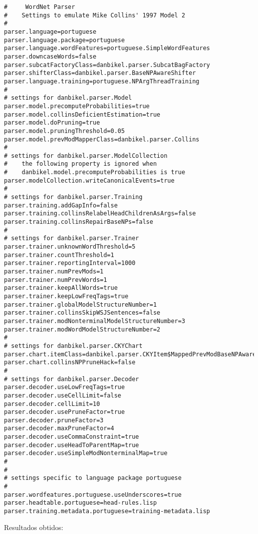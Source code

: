 \scriptsize
\begin{verbatim}
#     WordNet Parser
#    Settings to emulate Mike Collins' 1997 Model 2
#
parser.language=portuguese
parser.language.package=portuguese
parser.language.wordFeatures=portuguese.SimpleWordFeatures
parser.downcaseWords=false
parser.subcatFactoryClass=danbikel.parser.SubcatBagFactory
parser.shifterClass=danbikel.parser.BaseNPAwareShifter
parser.language.training=portuguese.NPArgThreadTraining
#
# settings for danbikel.parser.Model
parser.model.precomputeProbabilities=true
parser.model.collinsDeficientEstimation=true
parser.model.doPruning=true
parser.model.pruningThreshold=0.05
parser.model.prevModMapperClass=danbikel.parser.Collins
#
# settings for danbikel.parser.ModelCollection
#    the following property is ignored when
#    danbikel.model.precomputeProbabilities is true
parser.modelCollection.writeCanonicalEvents=true
#
# settings for danbikel.parser.Training
parser.training.addGapInfo=false
parser.training.collinsRelabelHeadChildrenAsArgs=false
parser.training.collinsRepairBaseNPs=false
#
# settings for danbikel.parser.Trainer
parser.trainer.unknownWordThreshold=5
parser.trainer.countThreshold=1
parser.trainer.reportingInterval=1000
parser.trainer.numPrevMods=1
parser.trainer.numPrevWords=1
parser.trainer.keepAllWords=true
parser.trainer.keepLowFreqTags=true
parser.trainer.globalModelStructureNumber=1
parser.trainer.collinsSkipWSJSentences=false
parser.trainer.modNonterminalModelStructureNumber=3
parser.trainer.modWordModelStructureNumber=2
#
# settings for danbikel.parser.CKYChart
parser.chart.itemClass=danbikel.parser.CKYItem$MappedPrevModBaseNPAware
parser.chart.collinsNPPruneHack=false
#
# settings for danbikel.parser.Decoder
parser.decoder.useLowFreqTags=true
parser.decoder.useCellLimit=false
parser.decoder.cellLimit=10
parser.decoder.usePruneFactor=true
parser.decoder.pruneFactor=3
parser.decoder.maxPruneFactor=4
parser.decoder.useCommaConstraint=true
parser.decoder.useHeadToParentMap=true
parser.decoder.useSimpleModNonterminalMap=true
#
#
# settings specific to language package portuguese
#
parser.wordfeatures.portuguese.useUnderscores=true
parser.headtable.portuguese=head-rules.lisp
parser.training.metadata.portuguese=training-metadata.lisp

\end{verbatim}

\normalsize

Resultados obtidos:

